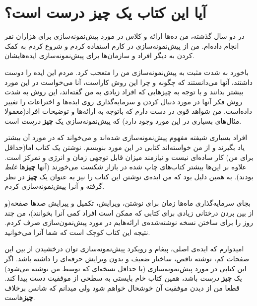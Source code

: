 \section{آیا این کتاب یک چیز درست
است؟}\label{ux622ux6ccux627-ux627ux6ccux646-ux6a9ux62aux627ux628-ux6ccux6a9-ux686ux6ccux632-ux62fux631ux633ux62a-ux627ux633ux62a}

در دو سال گذشته، من ده‌ها ارائه و کلاس در مورد پیش‌نمونه‌سازی برای
هزاران نفر انجام داده‌ام. من از پیش‌نمونه‌سازی در کارم استفاده کردم و
شروع کردم به کمک کردن به دیگر افراد و سازمان‌ها برای پیش‌نمونه‌سازی
ایده‌هایشان.

باخورد به شدت مثبت به پیش‌نمونه‌سازی من را متعجب کرد. مردم این ایده را
دوست داشتند، آنها می‌دانستند که چگونه و چرا این روش کاراست، آنا می‌خواست
در این مورد بیشتر بدانند و با توجه به چیزهایی که افراد زیادی به من
گفته‌اند، این روش به شدت روش فکر آنها در مورد دنبال کردن و سرمایه‌گذاری
روی ایده‌ها و اختراعات را تغییر داده‌است. من شواهد قوی در دست دارم که
باتوجه به ارائه‌ها و توضیحات افراد(معمولا مثال‌های بسیاری در این مورد
وجود دارد) که پیش‌نمونه‌سازی یک \textbf{چیز} \emph{درست} است.

افراد بسیاری شیفته مفهوم پیش‌نمونه‌سازی شده‌اند و می‌خواند که در مورد آن
بیشتر یاد بگیرند و از من خواسته‌اند کتابی در این مورد بنویسم. نوشتن یک
کتاب اما(حداقل برای من) کار ساده‌ای نیست و نیازمند میزان قابل توجهی زمان
و انرژی و تمرکز است. علاوه بر این‌ها بیشتر کتاب‌های چاپ شده در بازار
شکست می‌خورند (آنها \textbf{چیز}ها \emph{غلط} بودند). به همین دلیل بود
که من ایده‌ی نوشتن این کتاب را نیز به عنوان یک \textbf{چیز} در نظر گرفته
و آنرا پیش‌نمونه‌سازی کردم.

بجای سرمایه‌گذاری ماه‌ها زمان برای نوشتن، ویرایش، تکمیل و پیرایش صدها
صفحه(و از بین بردن درختانی زیادی برای کتابی که ممکن است افراد کمی آنرا
بخوانند)، من چند روز را برای ساختن نسخه نوشته‌شده‌ی ارائه‌هایم در مورد
پیش‌نمون‌سازی صرف کردم. نتیجه این کتاب کوچک است که شما آنرا می‌خوانید.

امیدوارم که ایده‌ی اصلی، پیغام و رویکرد پیش‌نمونه‌سازی توان درخشیدن از
بین این صفحات کم، نوشته ناقص، ساختار ضعیف و بدون ویرایش حرفه‌ای را داشته
باشد. اگر این کتابی در مورد پیش‌نمونه‌سازی (یا حداقل نسخه‌ای که توسط من
نوشته می‌شود) یک \textbf{چیز} \emph{درست} باشد، همین کتاب خام بایستی به
سطحی از موفقیت دست پیدا کند. قطعا من از دیدن موفقیت آن خوشحال خواهم شود
ولی میدانم که شانس برخلاف \textbf{چیز}هاست.
